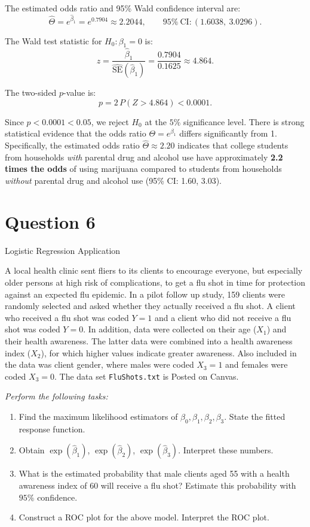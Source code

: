 \documentclass[letterpaper]{article}
\begin{document}
		The estimated odds ratio and 95\% Wald confidence interval are:
		\[
		\hat{\Theta} = e^{\hat{\beta}_1} = e^{0.7904} \approx 2.2044,
		\qquad
		95\%\ \text{CI}: (1.6038,\ 3.0296).
		\]
		
	
		The Wald test statistic for $H_0: \beta_1 = 0$ is:
		\[
		z = \frac{\hat{\beta}_1}{\widehat{\text{SE}}(\hat{\beta}_1)}
		= \frac{0.7904}{0.1625}
		\approx 4.864.
		\]
		
		The two-sided $p$-value is:
		\[
		p = 2\,P(Z > 4.864) < 0.0001.
		\]
		
		Since $p < 0.0001 < 0.05$, we reject $H_0$ at the
		$5\%$ significance level. There is strong statistical evidence that the
		odds ratio $\Theta = e^{\beta_1}$ differs significantly from 1.
		Specifically, the estimated odds ratio $\hat{\Theta} \approx 2.20$ indicates
		that college students from households \emph{with} parental drug and alcohol
		use have approximately \textbf{2.2 times the odds} of using marijuana
		compared to students from households \emph{without} parental drug and
		alcohol use (95\% CI: 1.60, 3.03).

	
	\clearpage
	
	\section{Question 6}
	
	{\color{deepred} Logistic Regression Application}
	
	A local health clinic sent fliers to its clients to encourage everyone, but especially older persons at high risk of complications, to get a flu shot in time for protection against an expected flu epidemic. In a pilot follow up study, 159 clients were randomly selected and asked whether they actually received a flu shot. A client who received a flu shot was coded $Y = 1$ and a client who did not receive a flu shot was coded $Y = 0$. In addition, data were collected on their age ($X_1$) and their health awareness. The latter data were combined into a health awareness index ($X_2$), for which higher values indicate greater awareness. Also included in the data was client gender, where males were coded $X_3 = 1$ and females were coded $X_3 = 0$. The data set \texttt{FluShots.txt} is Posted on Canvas.
	
	\textit{Perform the following tasks:}
	
	\begin{enumerate}
		\item Find the maximum likelihood estimators of $\beta_0, \beta_1, \beta_2, \beta_3$. State the fitted response function.
		\item Obtain $\exp(\hat{\beta}_1)$, $\exp(\hat{\beta}_2)$, $\exp(\hat{\beta}_3)$. Interpret these numbers.
		\item What is the estimated probability that male clients aged 55 with a health awareness index of 60 will receive a flu shot? Estimate this probability with $95\%$ confidence.
		\item Construct a ROC plot for the above model. Interpret the ROC plot.
	\end{enumerate}
\end{document}
